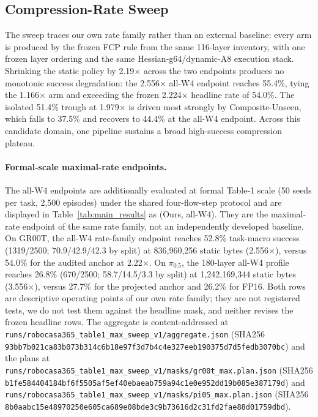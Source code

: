 \subsection{Compression-Rate Sweep}
\label{sec:compression_sweep}



The sweep traces our own rate family rather than an external baseline: every arm is produced by the frozen FCP rule from the same 116-layer inventory, with one frozen layer ordering and the same Hessian-g64/dynamic-A8 execution stack. Shrinking the static policy by 2.19$\times$ across the two endpoints produces no monotonic success degradation: the 2.556$\times$ all-W4 endpoint reaches 55.4\%, tying the 1.166$\times$ arm and exceeding the frozen 2.224$\times$ headline rate of 54.0\%. The isolated 51.4\% trough at 1.979$\times$ is driven most strongly by Composite-Unseen, which falls to 37.5\% and recovers to 44.4\% at the all-W4 endpoint. Across this candidate domain, one pipeline sustains a broad high-success compression plateau.

\paragraph{Formal-scale maximal-rate endpoints.}
The all-W4 endpoints are additionally evaluated at formal Table-1 scale (50 seeds per task, 2,500 episodes) under the shared four-flow-step protocol and are displayed in Table~\ref{tab:main_results} as \method (Ours, all-W4). They are the maximal-rate endpoint of the same rate family, not an independently developed baseline. On GR00T, the all-W4 rate-family endpoint reaches 52.8\% task-macro success (1319/2500; 70.9/42.9/42.3 by split) at 836,960,256 static bytes (2.556$\times$), versus 54.0\% for the audited anchor at 2.22$\times$. On $\pi_{0.5}$, the 180-layer all-W4 profile reaches 26.8\% (670/2500; 58.7/14.5/3.3 by split) at 1,242,169,344 static bytes (3.556$\times$), versus 27.7\% for the projected anchor and 26.2\% for FP16. Both rows are descriptive operating points of our own rate family; they are not registered tests, we do not test them against the headline mask, and neither revises the frozen headline rows. The aggregate is content-addressed at
\nolinkurl{runs/robocasa365_table1_max_sweep_v1/aggregate.json} (SHA256 \texttt{93bb7b021ca83b07\allowbreak 3b314c6b18e97f3\allowbreak d7b4c4e327eeb190\allowbreak 375d7d5fedb3070bc}) and the plans at
\nolinkurl{runs/robocasa365_table1_max_sweep_v1/masks/gr00t_max.plan.json} (SHA256 \texttt{b1fe584404184bf6\allowbreak f5505af5ef40ebae\allowbreak ab759a94c1e0e952\allowbreak dd19b085e387179d}) and
\nolinkurl{runs/robocasa365_table1_max_sweep_v1/masks/pi05_max.plan.json} (SHA256 \texttt{8b0aabc15e489702\allowbreak 50e605ca689e08bd\allowbreak e3c9b73616d2c31f\allowbreak d2fae88d01759dbd}).

